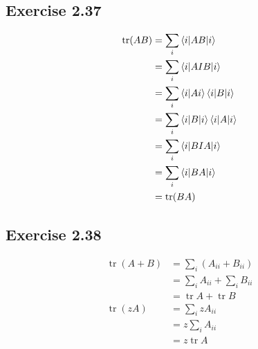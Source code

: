 \documentclass{article}
\newcommand{\tr}{\operatorname{tr}}
\begin{document}
\subsection*{Exercise 2.37}

\begin{align*}
  \tr (A B) & = \sum_i \braket{i | A B | i}                  \\
            & = \sum_i \braket{i | A I B | i}                \\
            & = \sum_i \braket{i | A i} \braket{i | B | i}   \\
            & = \sum_i \braket{i | B | i} \braket{i | A | i} \\
            & = \sum_i \braket{i | B I A | i}                \\
            & = \sum_i \braket{i | B A | i}                  \\
            & = \tr (B A)
\end{align*}

\subsection*{Exercise 2.38}

\begin{align*}
  \tr (A + B) & = \sum_i (A_{ii} + B_{ii})      \\
              & = \sum_i A_{ii} + \sum_i B_{ii} \\
              & = \tr A + \tr B                 \\
  \tr (z A)   & = \sum_i z A_{ii}               \\
              & = z \sum_i A_{ii}               \\
              & = z \tr A
\end{align*}
\end{document}
